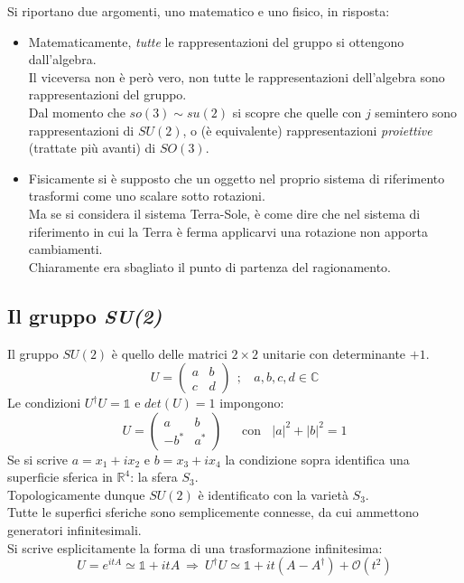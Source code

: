 \documentclass[twoside]{article}
\begin{document}
Si riportano due argomenti, uno matematico e uno fisico, in risposta:
\begin{itemize}
    \item Matematicamente, \textit{tutte} le rappresentazioni del gruppo si ottengono dall'algebra.
    \\
    Il viceversa non è però vero, non tutte le rappresentazioni dell'algebra sono rappresentazioni del gruppo.
    \\
    Dal momento che $so(3)\sim su(2)$ si scopre che quelle con $j$ semintero sono rappresentazioni di $SU(2)$, o (è equivalente) rappresentazioni \textit{proiettive} (trattate più avanti) di $SO(3)$.
    \item Fisicamente si è supposto che un oggetto nel proprio sistema di riferimento trasformi come uno scalare sotto rotazioni.
    \\
   \label{terra-sole}Ma se si considera il sistema Terra-Sole, è come dire che nel sistema di riferimento in cui la Terra è ferma applicarvi una rotazione non apporta cambiamenti.
    \\
    Chiaramente era sbagliato il punto di partenza del ragionamento.
\end{itemize}

\vspace{0.5cm}
\subsection{Il gruppo \textit{SU(2)}}
Il gruppo $SU(2)$ è quello delle matrici $2\times 2$ unitarie con determinante $+1$.
\begin{equation}
    U=\begin{pmatrix}
    a & b \\ c & d
    \end{pmatrix} \ \ ; \ \ \ \ a,b,c,d \in \mathds{C}
\end{equation}
Le condizioni $U^{\dagger}U=\mathds{1}$ e $det(U)=1$ impongono:
\begin{equation}
    U=\begin{pmatrix}
    a & b \\ -b^* & a^*
    \end{pmatrix} \ \ \ \ \ \ \ \text{con} \ \ \ \ |a|^2+|b|^2=1
\end{equation}
Se si scrive $a=x_1 +ix_2$ e $b=x_3 + i x_4$ la condizione sopra identifica una superficie sferica in $\mathds{R}^4$: la sfera $S_3$.
\\
Topologicamente dunque $SU(2)$ è identificato con la varietà $S_3$.
\\
Tutte le superfici sferiche sono semplicemente connesse, da cui ammettono generatori infinitesimali.
\\
Si scrive esplicitamente la forma di una trasformazione infinitesima:
\begin{equation}
    U=e^{itA}\simeq \mathds{1}+itA \ \Rightarrow \ U^{\dagger}U\simeq \mathds{1}+it(A-A^{\dagger})+\mathcal{O}(t^2)
\end{equation}
\end{document}
